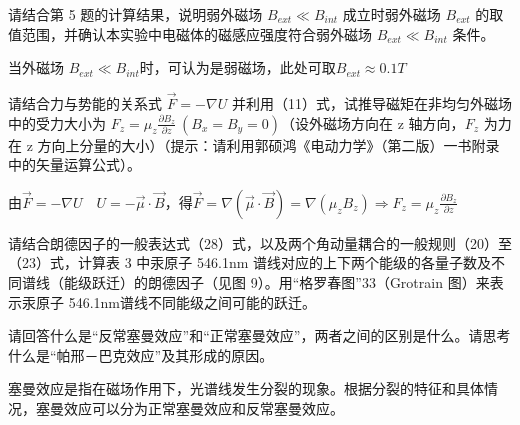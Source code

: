 \documentclass[dvipsnames, svgnames,a4paper,11pt]{article}
\begin{document}
\begin{question}
	请结合第 5 题的计算结果，说明弱外磁场 $B_{ext} \ll B_{int}$ 成立时弱外磁场 $B_{ext}$ 的取值范围，并确认本实验中电磁体的磁感应强度符合弱外磁场 $B_{ext} \ll B_{int}$ 条件。
\end{question}


	当外磁场 $B_{ext} \ll B_{int}$时，可认为是弱磁场，此处可取$B_{ext} \approx 0.1T$



\begin{question}
	请结合力与势能的关系式 $\vec{F} = -\nabla U $ 并利用（11）式，试推导磁矩在非均匀外磁场中的受力大小为 $F_z = \mu_z \frac{\partial B_z}{\partial z} \ (B_x = B_y = 0)$（设外磁场方向在 z 轴方向，$F_z$ 为力在 z 方向上分量的大小）（提示：请利用郭硕鸿《电动力学》（第二版）一书附录中的矢量运算公式）。
\end{question}

	由$\vec{F} = -\nabla U \quad U = -\vec{\mu} \cdot \vec{B}$，得$\vec{F} = \nabla(\vec{\mu} \cdot \vec{B}) = \nabla(\mu_z B_z) \Rightarrow F_z = \mu_z \frac{\partial B_z}{\partial z} $




\clearpage

\begin{question}
	请结合朗德因子的一般表达式（28）式，以及两个角动量耦合的一般规则（20）至（23）式，计算表 3 中汞原子 546.1nm 谱线对应的上下两个能级的各量子数及不同谱线（能级跃迁）的朗德因子（见图 9）。用“格罗春图”33（Grotrain 图）来表示汞原子 546.1nm谱线不同能级之间可能的跃迁。
\end{question}









\begin{question}
	请回答什么是“反常塞曼效应”和“正常塞曼效应”，两者之间的区别是什么。请思考什么是“帕邢－巴克效应”及其形成的原因。
\end{question}


	塞曼效应是指在磁场作用下，光谱线发生分裂的现象。根据分裂的特征和具体情况，塞曼效应可以分为正常塞曼效应和反常塞曼效应。
\end{document}
